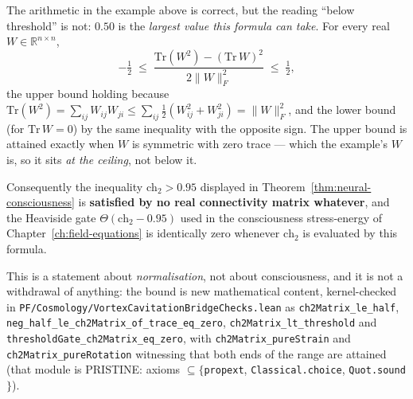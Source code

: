\begin{remark}
\label{rem:ch2-matrix-range-2026-10-03}
The arithmetic in the example above is correct, but the reading ``below
threshold'' is not: $0.50$ is the \emph{largest value this formula can take}.
For every real $W \in \mathbb{R}^{n \times n}$,
\begin{equation}
-\tfrac{1}{2} \;\leq\; \frac{\text{Tr}(W^2) - (\text{Tr}\,W)^2}{2\|W\|_F^2}
\;\leq\; \tfrac{1}{2},
\end{equation}
the upper bound holding because
$\text{Tr}(W^2) = \sum_{ij} W_{ij}W_{ji} \leq \sum_{ij} \tfrac{1}{2}(W_{ij}^2 + W_{ji}^2) = \|W\|_F^2$,
and the lower bound (for $\text{Tr}\,W = 0$) by the same inequality with the
opposite sign. The upper bound is attained exactly when $W$ is symmetric with
zero trace --- which the example's $W$ is, so it sits \emph{at the ceiling},
not below it.

Consequently the inequality $\text{ch}_2 > 0.95$ displayed in
Theorem~\ref{thm:neural-consciousness} is \textbf{satisfied by no real
connectivity matrix whatever}, and the Heaviside gate $\Theta(\text{ch}_2 - 0.95)$
used in the consciousness stress-energy of Chapter~\ref{ch:field-equations}
is identically zero whenever $\text{ch}_2$ is evaluated by this formula.

This is a statement about \emph{normalisation}, not about consciousness, and it is
not a withdrawal of anything: the bound is new mathematical content, kernel-checked
in \texttt{PF/Cosmology/VortexCavitationBridgeChecks.lean} as
\texttt{ch2Matrix\_le\_half}, \texttt{neg\_half\_le\_ch2Matrix\_of\_trace\_eq\_zero},
\texttt{ch2Matrix\_lt\_threshold} and \texttt{thresholdGate\_ch2Matrix\_eq\_zero},
with \texttt{ch2Matrix\_pureStrain} and \texttt{ch2Matrix\_pureRotation} witnessing
that both ends of the range are attained (that module is PRISTINE: axioms
$\subseteq \{$\texttt{propext}, \texttt{Classical.choice}, \texttt{Quot.sound}$\}$).


\end{remark}
